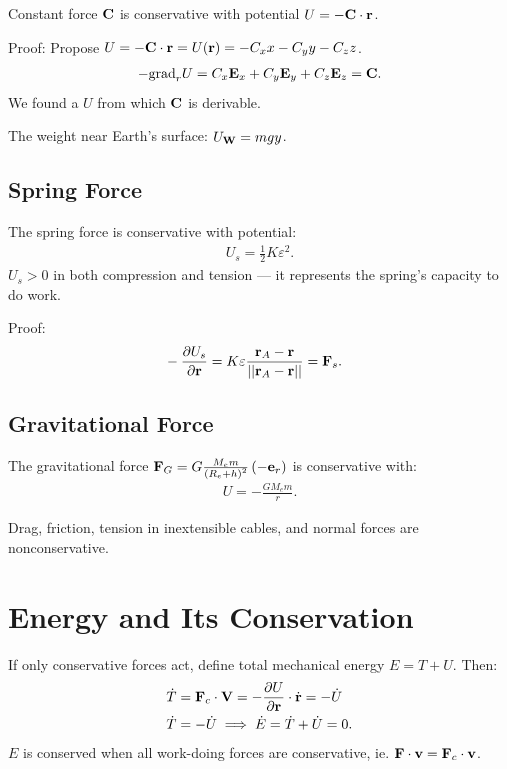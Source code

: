 \documentclass[
  letterpaper,
  DIV=11,
  numbers=noendperiod]{scrreprt}
\newcommand{\lp}{\left(}
\newcommand{\rp}{\right)}
\begin{document}
Constant force \({\bf C}\) is conservative with potential
\(U = -{\bf C}\cdot{\bf r}\).

Proof: Propose
\(U = -{\bf C}\cdot{\bf r} = U({\bf r}) = -C_x x-C_y y-C_z z\).
\begin{align}
    -\text{grad}_r{U} = C_x{\bf E}_x+C_y{\bf E}_y+C_z{\bf E}_z = {\bf C}.
\end{align} We found a \(U\) from which \({\bf C}\) is derivable.

The weight near Earth's surface: \(U_{\bf W} = mgy\).

\subsection{Spring Force}\label{spring-force-1}

The spring force is conservative with potential: \begin{align*}
    U_s = \frac{1}{2}K\varepsilon^2.
\end{align*} \(U_s > 0\) in both compression and tension --- it
represents the spring's capacity to do work.

Proof: \begin{align*}
    & -\frac{\partial U_s}{\partial {\bf r}} = K\varepsilon\frac{{\bf r}_A-{\bf r}}{||{\bf r}_A-{\bf r}||} = {\bf F}_s.
\end{align*}

\subsection{Gravitational Force}\label{gravitational-force-1}

The gravitational force
\({\bf F}_G = G\frac{M_e m}{\lp R_e+h\rp^2}\lp-{\bf e}_r\rp\) is
conservative with: \begin{align*}
    U = -\frac{GM_e m}{r}.
\end{align*}

Drag, friction, tension in inextensible cables, and normal forces are
nonconservative.

\section{Energy and Its Conservation}\label{energy-and-its-conservation}

If only conservative forces act, define total mechanical energy
\(E = T + U\). Then: \begin{align*}
    & \dot{T} = {\bf F}_c\cdot{\bf V} = -\frac{\partial U}{\partial {\bf r}}\cdot\dot{\bf r} = -\dot{U}\\
    & \dot{T} = -\dot{U} \implies \dot{E} = \dot{T}+\dot{U} = 0.
\end{align*} \(E\) is conserved when all work-doing forces are
conservative, ie. \({\bf F}\cdot{\bf v}={\bf F}_c\cdot{\bf v}\).
\end{document}
